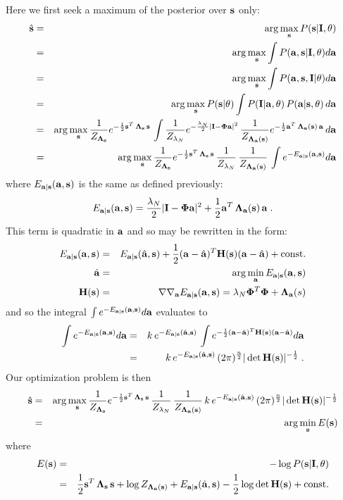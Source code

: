 \documentclass[12pt]{article}
\newcommand{\params}{\theta}
\newcommand{\ba}{{\bf a}}
\newcommand{\bah}{\hat{\bf a}}
\newcommand{\bs}{{\bf s}}
\newcommand{\bsh}{\hat{\bf s}}
\newcommand{\bI}{{\bf I}}
\newcommand{\bPhi}{{\bf \Phi}}
\newcommand{\bLambdas}{{\bf \Lambda_s}}
\newcommand{\bLambdaa}{{\bf \Lambda_a}}
\newcommand{\bH}{{\bf H}}
\begin{document}
Here we first seek a maximum of the posterior over $\bs$ only:
\begin{eqnarray}
\bsh & = & \arg\max_{\bs} P(\bs|\bI,\params) \\
 & = & \arg\max_{\bs} \int P(\ba,\bs|\bI,\params) d\ba \\
 & = & \arg\max_{\bs} \int P(\ba,\bs,\bI|\params) d\ba \\
 & = & \arg\max_{\bs} P(\bs|\params) 
                      \int P(\bI|\ba,\params)\, P(\ba|\bs,\params)\, d\ba \\
 & = & \arg\max_{\bs} 
       \frac{1}{Z_{\bLambdas}} e^{-\frac{1}{2} \bs^T \, \bLambdas\, \bs} \,
       \int \frac{1}{Z_{\lambda_N}} e^{-\frac{\lambda_N}{2}|\bI-\bPhi\ba|^2} \, 
            \frac{1}{Z_{\bLambdaa(\bs)}}
              e^{-\frac{1}{2} \ba^T \, \bLambdaa(\bs)\, \ba} \, d\ba\\
 & = & \arg\max_{\bs} 
       \frac{1}{Z_{\bLambdas}} e^{-\frac{1}{2} \bs^T \, \bLambdas\, \bs} \,
       \frac{1}{Z_{\lambda_N}} \, \frac{1}{Z_{\bLambdaa(\bs)}} \,
       \int e^{-E_{\ba|\bs}(\ba,\bs)} d\ba
\label{eq:E-integral}
\end{eqnarray}
where $E_{\ba|\bs}(\ba,\bs)$ is the same as defined previously:
\begin{equation}
E_{\ba|\bs}(\ba,\bs) = \frac{\lambda_N}{2}|\bI-\bPhi \ba|^2 
                        +  \frac{1}{2} \ba^T \, \bLambdaa(\bs)\, \ba \; .
\end{equation}
This term is quadratic in $\ba$ and so may be rewritten in the form:
\begin{eqnarray}
E_{\ba|\bs}(\ba,\bs) & = & 
  E_{\ba|\bs}(\bah,\bs) + \frac{1}{2}(\ba-\bah)^T \bH(\bs) (\ba-\bah) 
  + \mbox{const.} \\
\bah & = & \arg\min_{\ba} E_{\ba|\bs}(\ba,\bs) \\
\bH(\bs) &  = & \nabla\nabla_{\ba} E_{\ba|\bs}(\ba,\bs)
  =  \lambda_N \bPhi^T\bPhi + \bLambdaa(s) 
\end{eqnarray}
and so the integral $\int e^{-E_{\ba|\bs}(\ba,\bs)}d\ba$ evaluates to
\begin{eqnarray}
\int e^{-E_{\ba|\bs}(\ba,\bs)} d\ba & = & k\, e^{-E_{\ba|\bs}(\bah,\bs)} \, 
    \int e^{-\frac{1}{2}(\ba-\bah)^T \bH(\bs) (\ba-\bah)} d\ba  \\
 & = & k\, e^{-E_{\ba|\bs}(\bah,\bs)} \, 
       (2\pi)^{\frac{n}{2}} |\det \bH(\bs)|^{-\frac{1}{2}}  \; . 
\end{eqnarray}
Our optimization problem is then
\begin{eqnarray}
\bsh & = & \arg\max_{\bs} 
       \frac{1}{Z_{\bLambdas}} e^{-\frac{1}{2} \bs^T \, \bLambdas\, \bs} \,
       \frac{1}{Z_{\lambda_N}} \, \frac{1}{Z_{\bLambdaa(\bs)}} \,
       k\, e^{-E_{\ba|\bs}(\bah,\bs)} \, 
       (2\pi)^{\frac{n}{2}} |\det \bH(\bs)|^{-\frac{1}{2}}  \\
 & = & \arg\min_{\bs} E(\bs)
\end{eqnarray}
where
\begin{eqnarray}
E(\bs) & = & -\log P(\bs|\bI,\params) \\
 & = & \frac{1}{2} \bs^T \, \bLambdas\, \bs + \log Z_{\bLambdaa(\bs)}
       + E_{\ba|\bs}(\bah,\bs) - \frac{1}{2}\log\det \bH(\bs) + \mbox{const.} 
\label{eq:Es}
\end{eqnarray}
\end{document}
